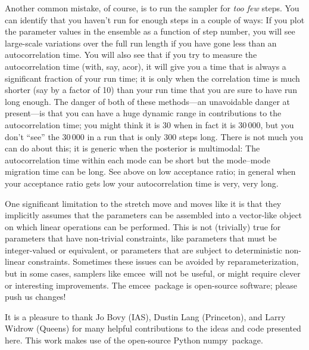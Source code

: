 \documentclass[12pt,preprint]{aastex}
\newcommand{\project}[1]{{\sffamily #1}}
\newcommand{\numpy}{\project{numpy}}
\newcommand{\acor}{\project{acor}}
\newcommand{\thisplain}{emcee}
\newcommand{\this}{\project{\thisplain}}
\begin{document}
Another common mistake, of course, is to run the sampler for \emph{too
  few} steps.  You can identify that you haven't run for enough steps
in a couple of ways: If you plot the parameter values in the ensemble
as a function of step number, you will see large-scale variations over
the full run length if you have gone less than an autocorrelation
time.  You will also see that if you try to measure the
autocorrelation time (with, say, \acor), it will give you a time that
is always a significant fraction of your run time; it is only when the
correlation time is much shorter (say by a factor of 10) than your run
time that you are sure to have run long enough.  The danger of both of
these methods---an unavoidable danger at present---is that you can
have a huge dynamic range in contributions to the autocorrelation
time; you might think it is 30 when in fact it is 30\,000, but you
don't ``see'' the 30\,000 in a run that is only 300 steps long.  There
is not much you can do about this; it is generic when the posterior is
multimodal: The autocorrelation time within each mode can be short but
the mode--mode migration time can be long.  See above on low
acceptance ratio; in general when your acceptance ratio gets low your
autocorrelation time is very, very long.

One significant limitation to the stretch move and moves like it is
that they implicitly assumes that the parameters can be assembled into
a vector-like object on which linear operations can be performed.
This is not (trivially) true for parameters that have non-trivial
constraints, like parameters that must be integer-valued or
equivalent, or parameters that are subject to deterministic non-linear
constraints.  Sometimes these issues can be avoided by
reparameterization, but in some cases, samplers like \this\ will not
be useful, or might require clever or interesting improvements.  The
\this\ package is open-source software; please push us changes!

\acknowledgments It is a pleasure to thank Jo Bovy (IAS), Dustin Lang
(Princeton), and Larry Widrow (Queens) for many helpful contributions
to the ideas and code presented here.  This work makes use of the
open-source Python \numpy\ package.
\end{document}
